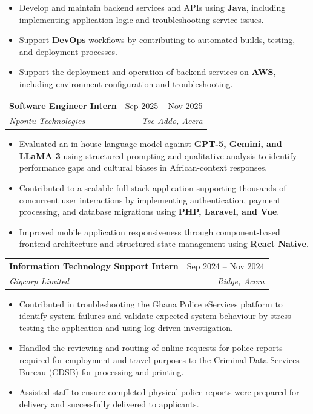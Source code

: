 \documentclass[letterpaper,10pt]{article}
\makeatletter
\newcommand{\resumeItem}[1]{
  \item\small{#1}
}
\newcommand{\resumeSubheading}[4]{
  \item
  \begin{tabular*}{0.98\textwidth}
    {l@{\extracolsep{\fill}}r}
    \textbf{#1} & #2 \\
    \textit{\small #3} & \textit{\small #4} \\
  \end{tabular*}
  \vspace{-3pt}
}
\newcommand{\resumeItemListStart}{
  \begin{itemize}[leftmargin=0.20in,label=\textbullet,itemsep=2pt,parsep=0pt,topsep=3pt]
}
\newcommand{\resumeItemListEnd}{
  \end{itemize}\vspace{-3pt}
}
\makeatother
\begin{document}
  \resumeItemListStart
    \resumeItem{
      Develop and maintain backend services and APIs using
      \textbf{Java}, including implementing application logic
      and troubleshooting service issues.
    }

    \resumeItem{
      Support \textbf{DevOps} workflows by contributing to
      automated builds, testing, and deployment processes.
    }

    \resumeItem{
      Support the deployment and operation of backend services
      on \textbf{AWS}, including environment
      configuration and troubleshooting.
    }
  \resumeItemListEnd

  \resumeSubheading
    {Software Engineer Intern}
    {Sep 2025 -- Nov 2025}
    {Npontu Technologies}
    {Tse Addo, Accra}

  \resumeItemListStart
    \resumeItem{
      Evaluated an in-house language model against
      \textbf{GPT-5, Gemini, and LLaMA 3}
      using structured prompting and qualitative
      analysis to identify performance gaps and
      cultural biases in African-context responses.
    }

    \resumeItem{
      Contributed to a scalable full-stack application
      supporting thousands of concurrent user interactions
      by implementing authentication, payment processing,
      and database migrations using
      \textbf{PHP, Laravel, and Vue}.
    }

    \resumeItem{
      Improved mobile application responsiveness
      through component-based frontend architecture
      and structured state management using
      \textbf{React Native}.
    }
  \resumeItemListEnd

  \resumeSubheading
    {Information Technology Support Intern}
    {Sep 2024 -- Nov 2024}
    {Gigcorp Limited}
    {Ridge, Accra}

  \resumeItemListStart
    \resumeItem{
      Contributed in troubleshooting the Ghana Police eServices platform to identify system failures and validate expected system
      behaviour by stress testing the application and using log-driven investigation.
    }

    \resumeItem{
      Handled the reviewing and routing of online requests for police
      reports required for employment and travel purposes
      to the Criminal Data Services Bureau (CDSB) for
      processing and printing.
    }

    \resumeItem{
      Assisted staff to ensure completed physical police
      reports were prepared for delivery and successfully delivered to applicants.
    }
  \resumeItemListEnd
\end{document}
